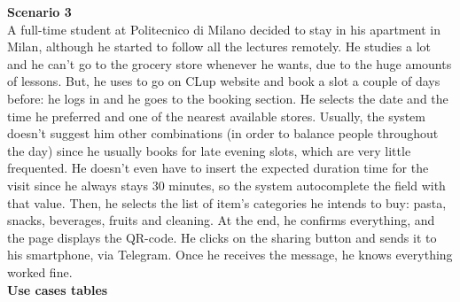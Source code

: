 \documentclass[table, 12pt]{article}
\begin{document}
\textbf{Scenario 3}\\
A full-time student at Politecnico di Milano decided to stay in his apartment in Milan, although he started to follow all the lectures remotely. He studies a lot and he can't go to the grocery store whenever he wants, due to the huge amounts of lessons. But, he uses to go on CLup website and book a slot a couple of days before: he logs in and he goes to the booking section. He selects the date and the time he preferred and one of the nearest available stores. Usually, the system doesn't suggest him other combinations (in order to balance people throughout the day) since he usually books for late evening slots, which are very little frequented. He doesn't even have to insert the expected duration time for the visit since he always stays 30 minutes, so the system autocomplete the field with that value. Then, he selects the list of item's categories he intends to buy: pasta, snacks, beverages, fruits and cleaning. At the end, he confirms everything, and the page displays the QR-code. He clicks on the sharing button and sends it to his smartphone, via Telegram. Once he receives the message, he knows everything worked fine.\\

\newpage
\textbf{Use cases tables}\\
\end{document}
